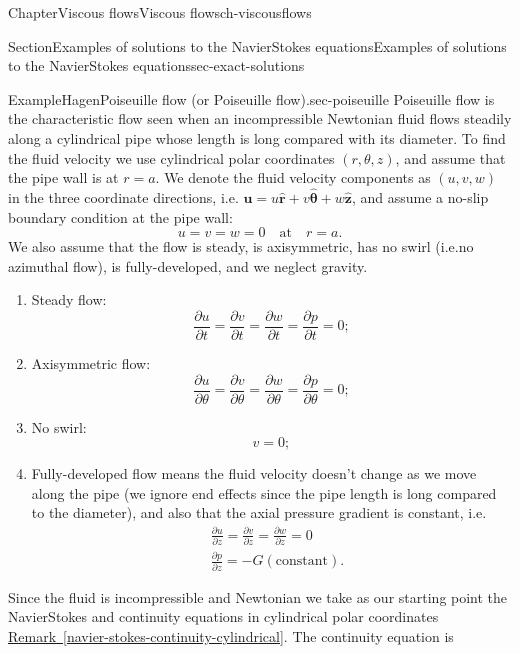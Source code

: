 \documentclass[oneside,10pt,]{book}
\newcommand{\xreffont}{\relax}
\numberwithin{equation}{section}
\newcommand{\pd}[2]{\frac{\partial#1}{\partial#2}}
\newcommand{\bu}{\boldsymbol{u}}
\newcommand{\br}{\boldsymbol{r}}
\newcommand{\btheta}{\boldsymbol{\theta}}
\newcommand{\bz}{\boldsymbol{z}}
\begin{document}
\begin{chapterptx}{Chapter}{Viscous flows}{}{Viscous flows}{}{}{ch-viscousflows}
\begin{sectionptx}{Section}{Examples of solutions to the Navier\textendash{}Stokes equations}{}{Examples of solutions to the Navier\textendash{}Stokes equations}{}{}{sec-exact-solutions}
\begin{example}{Example}{Hagen\textendash{}Poiseuille flow (or Poiseuille flow).}{sec-poiseuille}%
Poiseuille flow is the characteristic flow seen when an incompressible Newtonian fluid flows steadily along a cylindrical pipe whose length is long compared with its diameter. To find the fluid velocity we use cylindrical polar coordinates \((r,\theta,z)\), and assume that the pipe wall is at \(r=a\). We denote the fluid velocity components as \((u,v,w)\) in the three coordinate directions, i.e. \(\bu=u\hat{\br}+v\hat{\btheta}+w\hat{\bz}\), and assume a no-slip boundary condition at the pipe wall:%
\begin{equation}
u=v=w=0\quad\mathrm{at}\quad r=a.\label{eq-poiseuillebc}
\end{equation}
We also assume that the flow is steady, is axisymmetric, has no swirl (i.e.no azimuthal flow), is fully-developed, and we neglect gravity.%
\begin{enumerate}
\item{}Steady flow:%
\begin{equation*}
\pd{u}{t}=\pd{v}{t}=\pd{w}{t}=\pd{p}{t}=0;
\end{equation*}
%
\item{}Axisymmetric flow:%
\begin{equation*}
\pd{u}{\theta}=\pd{v}{\theta}=\pd{w}{\theta}=\pd{p}{\theta}=0;
\end{equation*}
%
\item{}No swirl:%
\begin{equation*}
v=0;
\end{equation*}
%
\item{}Fully-developed flow means the fluid velocity doesn't change as we move along the pipe (we ignore end effects since the pipe length is long compared to the diameter), and also that the axial pressure gradient is constant, i.e.%
\begin{align*}
&\pd{u}{z}=\pd{v}{z}=\pd{w}{z}=0\\
&\pd{p}{z}=-G\mathrm{(constant)}.
\end{align*}
%
\end{enumerate}
%
\par
Since the fluid is incompressible and Newtonian we take as our starting point the Navier\textendash{}Stokes and continuity equations in cylindrical polar coordinates \hyperref[navier-stokes-continuity-cylindrical]{Remark~{\xreffont\ref{navier-stokes-continuity-cylindrical}}}. The continuity equation is%
\begin{equation*}

\end{equation*}
\end{example}
\end{sectionptx}
\end{chapterptx}
\end{document}
